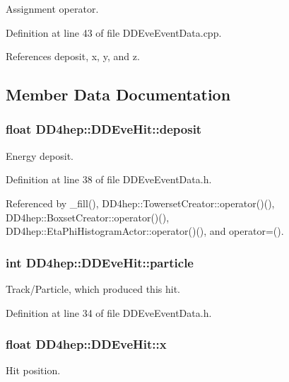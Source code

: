 Assignment operator. 

Definition at line 43 of file DDEveEventData.cpp.

References deposit, x, y, and z.

\subsection{Member Data Documentation}
\hypertarget{class_d_d4hep_1_1_d_d_eve_hit_ad45cf3f4b4496c2b6db9de03ce77b4a6}{
\subsubsection[{deposit}]{\setlength{\rightskip}{0pt plus 5cm}float {\bf DD4hep::DDEveHit::deposit}}}
\label{class_d_d4hep_1_1_d_d_eve_hit_ad45cf3f4b4496c2b6db9de03ce77b4a6}


Energy deposit. 

Definition at line 38 of file DDEveEventData.h.

Referenced by \_\-fill(), DD4hep::TowersetCreator::operator()(), DD4hep::BoxsetCreator::operator()(), DD4hep::EtaPhiHistogramActor::operator()(), and operator=().\hypertarget{class_d_d4hep_1_1_d_d_eve_hit_a35b41dfc3b314771711c4b35ba1145f5}{
\subsubsection[{particle}]{\setlength{\rightskip}{0pt plus 5cm}int {\bf DD4hep::DDEveHit::particle}}}
\label{class_d_d4hep_1_1_d_d_eve_hit_a35b41dfc3b314771711c4b35ba1145f5}


Track/Particle, which produced this hit. 

Definition at line 34 of file DDEveEventData.h.\hypertarget{class_d_d4hep_1_1_d_d_eve_hit_aa43de1b526423ff9a1dd54ac140b6941}{
\subsubsection[{x}]{\setlength{\rightskip}{0pt plus 5cm}float {\bf DD4hep::DDEveHit::x}}}
\label{class_d_d4hep_1_1_d_d_eve_hit_aa43de1b526423ff9a1dd54ac140b6941}


Hit position. 

